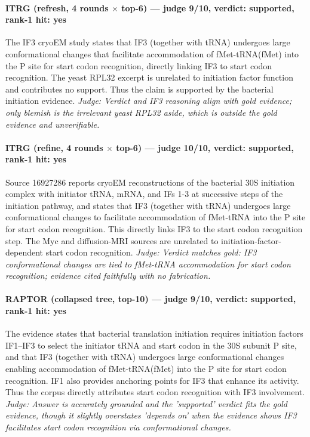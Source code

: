 \documentclass[sigconf, review, anonymous]{acmart}
\begin{document}
\paragraph{ITRG (refresh, 4 rounds $\times$ top-6) --- judge 9/10, verdict: supported, rank-1 hit: yes}
\noindent The IF3 cryoEM study states that IF3 (together with tRNA) undergoes large conformational changes that facilitate accommodation of fMet-tRNA(fMet) into the P site for start codon recognition, directly linking IF3 to start codon recognition. The yeast RPL32 excerpt is unrelated to initiation factor function and contributes no support. Thus the claim is supported by the bacterial initiation evidence.
\noindent\small\textit{Judge: Verdict and IF3 reasoning align with gold evidence; only blemish is the irrelevant yeast RPL32 aside, which is outside the gold evidence and unverifiable.}
\paragraph{ITRG (refine, 4 rounds $\times$ top-6) --- judge 10/10, verdict: supported, rank-1 hit: yes}
\noindent Source 16927286 reports cryoEM reconstructions of the bacterial 30S initiation complex with initiator tRNA, mRNA, and IFs 1-3 at successive steps of the initiation pathway, and states that IF3 (together with tRNA) undergoes large conformational changes to facilitate accommodation of fMet-tRNA into the P site for start codon recognition. This directly links IF3 to the start codon recognition step. The Myc and diffusion-MRI sources are unrelated to initiation-factor-dependent start codon recognition.
\noindent\small\textit{Judge: Verdict matches gold: IF3 conformational changes are tied to fMet-tRNA accommodation for start codon recognition; evidence cited faithfully with no fabrication.}
\paragraph{RAPTOR (collapsed tree, top-10) --- judge 9/10, verdict: supported, rank-1 hit: yes}
\noindent The evidence states that bacterial translation initiation requires initiation factors IF1--IF3 to select the initiator tRNA and start codon in the 30S subunit P site, and that IF3 (together with tRNA) undergoes large conformational changes enabling accommodation of fMet-tRNA(fMet) into the P site for start codon recognition. IF1 also provides anchoring points for IF3 that enhance its activity. Thus the corpus directly attributes start codon recognition with IF3 involvement.
\noindent\small\textit{Judge: Answer is accurately grounded and the 'supported' verdict fits the gold evidence, though it slightly overstates 'depends on' when the evidence shows IF3 facilitates start codon recognition via conformational changes.}
\end{document}
